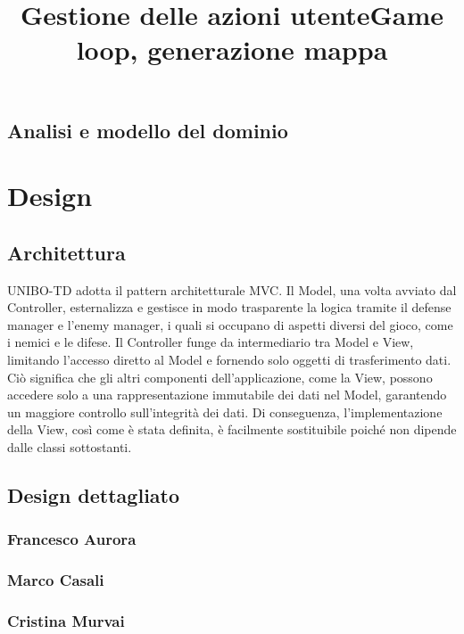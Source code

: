 \documentclass[a4paper,12pt]{report}
\begin{document}
\section{Analisi e modello del dominio}



\chapter{Design}

\section{Architettura}

UNIBO-TD adotta il pattern architetturale MVC. Il Model, una volta avviato dal Controller, esternalizza e gestisce in modo trasparente la logica tramite il defense manager e l'enemy manager, i quali si occupano di aspetti diversi del gioco, come i nemici e le difese. Il Controller funge da intermediario tra Model e View, limitando l'accesso diretto al Model e fornendo solo oggetti di trasferimento dati. Ciò significa che gli altri componenti dell'applicazione, come la View, possono accedere solo a una rappresentazione immutabile dei dati nel Model, garantendo un maggiore controllo sull'integrità dei dati. Di conseguenza, l'implementazione della View, così come è stata definita, è facilmente sostituibile poiché non dipende dalle classi sottostanti.





\section{Design dettagliato}
\subsection{Francesco Aurora}
\title{\textbf{Gestione delle azioni utente}}
\subsection{Marco Casali}
\title{\textbf{Game loop, generazione mappa}}




\newpage
\subsection{Cristina Murvai}
\end{document}
